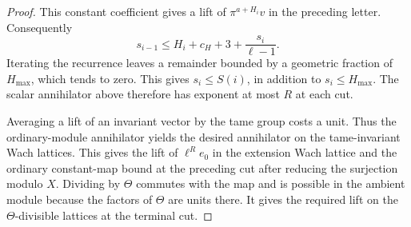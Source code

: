 \begin{proof}
This constant coefficient gives a lift of
\(\pi^{a+H_i}v\) in the preceding letter. Consequently
\[
                  s_{i-1}\le H_i+c_H+3+\frac{s_i}{\ell-1}.
\]
Iterating the recurrence leaves a remainder bounded by a
geometric fraction of \(H_{\max}\), which tends to zero.
This gives \(s_i\le S(i)\), in addition to
\(s_i\le H_{\max}\). The scalar annihilator above therefore
has exponent at most \(R\) at each cut.

Averaging a lift of an invariant vector by the tame group costs
a unit. Thus the ordinary-module annihilator yields the desired
annihilator on the tame-invariant Wach lattices. This gives
the lift of \(\ell^R e_0\) in the extension Wach lattice and
the ordinary constant-map bound at the preceding cut after
reducing the surjection modulo \(X\). Dividing by \(\Theta\)
commutes with the map and is possible in the ambient module
because the factors of \(\Theta\) are units there. It gives
the required lift on the \(\Theta\)-divisible lattices at
the terminal cut.
\end{proof}
